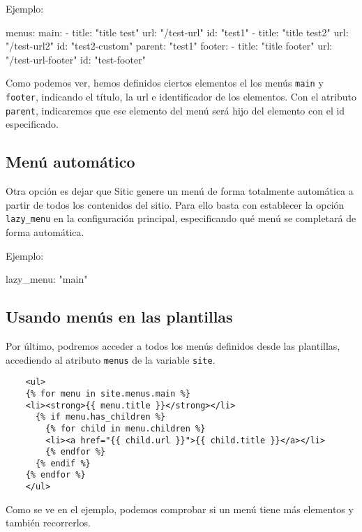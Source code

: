Ejemplo:

\begin{yamlcode}
    menus:
        main:
            - title: "title test"
              url: "/test-url"
              id: "test1"
            - title: "title test2"
              url: "/test-url2"
              id: "test2-custom"
              parent: "test1"
        footer:
            - title: "title footer"
              url: "/test-url-footer"
              id: "test-footer"
\end{yamlcode}

Como podemos ver, hemos definidos ciertos elementos el los menús \texttt{main} y \texttt{footer},
indicando el título, la url e identificador de los elementos. Con el atributo \texttt{parent},
indicaremos que ese elemento del menú será hijo del elemento con el id especificado.

\subsection{Menú automático}

Otra opción es dejar que Sitic genere un menú de forma totalmente automática a partir de todos los
contenidos del sitio. Para ello basta con establecer la opción \texttt{lazy\_menu} en la configuración
principal, especificando qué menú se completará de forma automática.

Ejemplo:

\begin{yamlcode}
    lazy_menu: "main"
\end{yamlcode}

\subsection{Usando menús en las plantillas}

Por último, podremos acceder a todos los menús definidos desde las plantillas, accediendo al atributo
\texttt{menus} de la variable \texttt{site}.

\begin{verbatim}
    <ul>
    {% for menu in site.menus.main %}
    <li><strong>{{ menu.title }}</strong></li>
      {% if menu.has_children %}
        {% for child in menu.children %}
        <li><a href="{{ child.url }}">{{ child.title }}</a></li>
        {% endfor %}
      {% endif %}
    {% endfor %}
    </ul>
\end{verbatim}

Como se ve en el ejemplo, podemos comprobar si un menú tiene más elementos y también recorrerlos.

